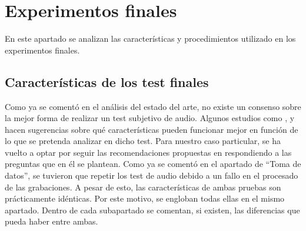\documentclass[11pt,a4paper]{book}
\begin{document}
        \section{Experimentos finales}
            En este apartado se analizan las características y procedimientos utilizado en los experimentos finales.     
            
            \subsection{Características de los test finales}
                Como ya se comentó en el análisis del estado del arte, no existe un consenso sobre la mejor forma de realizar un test subjetivo de audio. Algunos estudios como \cite{Tejada2020}, \cite{delaPrida2019} y \cite{delaPrida2021} hacen sugerencias sobre qué características pueden funcionar mejor en función de lo que se pretenda analizar en dicho test. Para nuestro caso particular, se ha vuelto a optar por seguir las recomendaciones propuestas en \cite{Tejada2020} respondiendo a las preguntas que en él se plantean. Como ya se comentó en el apartado de ``Toma de datos'', se tuvieron que repetir los test de audio debido a un fallo en el procesado de las grabaciones. A pesar de esto, las características de ambas pruebas son prácticamente idénticas. Por este motivo, se engloban todas ellas en el mismo apartado. Dentro de cada subapartado se comentan, si existen, las diferencias que pueda haber entre ambas.
            
\end{document}
